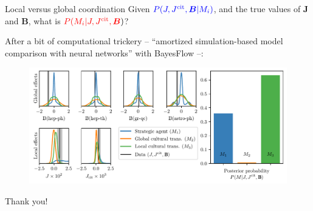 \documentclass[10pt]{beamer}
\begin{document}
\begin{frame}{Local versus global coordination}
    Given $\textcolor{blue}{P(J,J^\text{cit},\bm{B}|M_i)}$, and the true values of $\bm{J}$ and $\bm{B}$, what is $\textcolor{red}{P(M_i|J,J^{\text{cit}},\bm{B}})$?

    After a bit of computational trickery -- ``amortized simulation-based model comparison with neural networks'' with BayesFlow --:
    
    \begin{figure}
        \centering
        \includegraphics[width=0.9\linewidth]{draws_compact.pdf}
    \end{figure}
\end{frame}

\begin{frame}{Thank you!}
    \nocite{radev2021amortized}
    \printbibliography[heading=none]
\end{frame}
\end{document}
